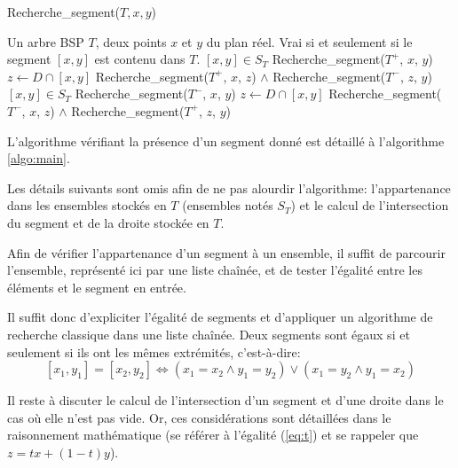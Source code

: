 
\begin{algorithm}
  \caption{Recherche\_segment($T, x, y$)}
  \begin{algorithmic}[1] \label{algo:main}
    \REQUIRE Un arbre BSP $T$, deux points $x$ et $y$ du plan réel.
    \ENSURE Vrai si et seulement si le segment $[x, y]$ est contenu dans $T$.
    \RETURN $[x, y]\in S_T$
    \ENDIF
      \RETURN Recherche\_segment($T^+$, $x$, $y$)
      \ELSE
      \STATE $z \leftarrow D \cap [x, y]$
      \RETURN Recherche\_segment($T^+$, $x$, $z$) $\land$ Recherche\_segment($T^-$, $z$, $y$)
      \ENDIF
      \ELSE
      \RETURN $[x, y]\in S_T$
      \RETURN Recherche\_segment($T^-$, $x$, $y$)
      \ELSE
      \STATE $z \leftarrow D \cap [x, y]$
      \RETURN Recherche\_segment($T^-$, $x$, $z$) $\land$ Recherche\_segment($T^+$, $z$, $y$)
      \ENDIF
    \ENDIF
  \end{algorithmic}
\end{algorithm}

L'algorithme vérifiant la présence d'un segment donné est détaillé à
l'algorithme \ref{algo:main}.

Les détails suivants sont omis afin de ne pas alourdir l'algorithme:
l'appartenance dans les ensembles stockés en $T$ (ensembles notés
$S_T$) et le calcul de l'intersection du segment et de la
droite stockée en $T$.

Afin de vérifier l'appartenance d'un segment à un ensemble, il
suffit de parcourir l'ensemble, représenté ici par une liste
chaînée, et de tester l'égalité entre les éléments et le segment
en entrée.

Il suffit donc d'expliciter l'égalité de segments et d'appliquer
un algorithme de recherche classique dans une liste chaînée.
Deux segments sont égaux si et seulement si ils ont les
mêmes extrémités, c'est-à-dire:
$$ [x_1, y_1] = [x_2, y_2] \iff
(x_1 = x_2 \land y_1 = y_2) \lor (x_1 = y_2 \land y_1 = x_2) $$

Il reste à discuter le calcul de l'intersection d'un segment
et d'une droite dans le cas où elle n'est pas vide. Or, ces
considérations sont détaillées dans le raisonnement mathématique
(se référer à l'égalité (\ref{eq:t}) et se rappeler que $z = tx + (1-t) y$).
